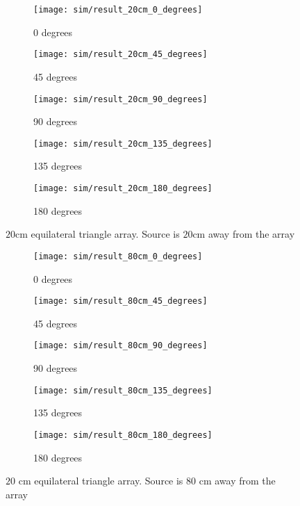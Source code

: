 \begin{figure*}[]
  \centering
  \begin{subfigure}[]{.3\textwidth}
    \texttt{[image: sim/result\_20cm\_0\_degrees]}
    \caption{0 degrees}
  \end{subfigure}
  \begin{subfigure}[]{.3\textwidth}
    \texttt{[image: sim/result\_20cm\_45\_degrees]}
    \caption{45 degrees}
  \end{subfigure}
  \begin{subfigure}[]{.3\textwidth}
    \texttt{[image: sim/result\_20cm\_90\_degrees]}
    \caption{90 degrees}
  \end{subfigure}
  \begin{subfigure}[]{.3\textwidth}
    \texttt{[image: sim/result\_20cm\_135\_degrees]}
    \caption{135 degrees}
  \end{subfigure}
  \begin{subfigure}[]{.3\textwidth}
    \texttt{[image: sim/result\_20cm\_180\_degrees]}
    \caption{180 degrees}
  \end{subfigure}
  \caption{$20$cm equilateral triangle array. Source is $20$cm away from the array}
  \label{fig:sim_3_2}
\end{figure*}

\begin{figure*}[]
  \centering
  \begin{subfigure}[]{.3\textwidth}
    \texttt{[image: sim/result\_80cm\_0\_degrees]}
    \caption{0 degrees}
  \end{subfigure}
  \begin{subfigure}[]{.3\textwidth}
    \texttt{[image: sim/result\_80cm\_45\_degrees]}
    \caption{45 degrees}
  \end{subfigure}
  \begin{subfigure}[]{.3\textwidth}
    \texttt{[image: sim/result\_80cm\_90\_degrees]}
    \caption{90 degrees}
  \end{subfigure}
  \begin{subfigure}[]{.3\textwidth}
    \texttt{[image: sim/result\_80cm\_135\_degrees]}
    \caption{135 degrees}
  \end{subfigure}
  \begin{subfigure}[]{.3\textwidth}
    \texttt{[image: sim/result\_80cm\_180\_degrees]}
    \caption{180 degrees}
  \end{subfigure}
  \caption{$20$ cm equilateral triangle array. Source is $80$ cm away from the array}
  \label{fig:sim_3_8}
\end{figure*}

